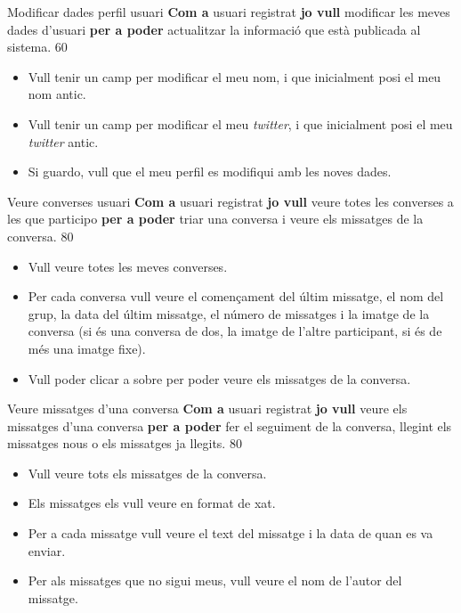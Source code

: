 \pintaHistoria
    {Modificar dades perfil usuari}
    {\textbf{Com a} usuari registrat \textbf{jo vull} modificar les meves dades d'usuari \textbf{per a poder} actualitzar la informació que està publicada al sistema.}
    {60}
    {
    \begin{itemize}[leftmargin=0.3cm]
        \item Vull tenir un camp per modificar el meu nom, i que inicialment posi el meu nom antic.
        \item Vull tenir un camp per modificar el meu \textit{twitter}, i que inicialment posi el meu \textit{twitter} antic.
        \item Si guardo, vull que el meu perfil es modifiqui amb les noves dades.
    \end{itemize}
    }
    
\pintaHistoria
    {Veure converses usuari}
    {\textbf{Com a} usuari registrat \textbf{jo vull} veure totes les converses a les que participo \textbf{per a poder} triar una conversa i veure els missatges de la conversa.}
    {80}
    {
    \begin{itemize}[leftmargin=0.3cm]
        \item Vull veure totes les meves converses. 
        \item Per cada conversa vull veure el començament del últim missatge, el nom del grup, la data del últim missatge, el número de missatges i la imatge de la conversa (si és una conversa de dos, la imatge de l'altre participant, si és de més una imatge fixe).
        \item Vull poder clicar a sobre per poder veure els missatges de la conversa.
    \end{itemize}
    }

\pintaHistoria
    {Veure missatges d'una conversa}
    {\textbf{Com a} usuari registrat \textbf{jo vull} veure els missatges d'una conversa \textbf{per a poder} fer el seguiment de la conversa, llegint els missatges nous o els missatges ja llegits.}
    {80}
    {
    \begin{itemize}[leftmargin=0.3cm]
        \item Vull veure tots els missatges de la conversa.
        \item Els missatges els vull veure en format de xat.
        \item Per a cada missatge vull veure el text del missatge i la data de quan es va enviar.
        \item Per als missatges que no sigui meus, vull veure el nom de l'autor del missatge.
    \end{itemize}
    }

